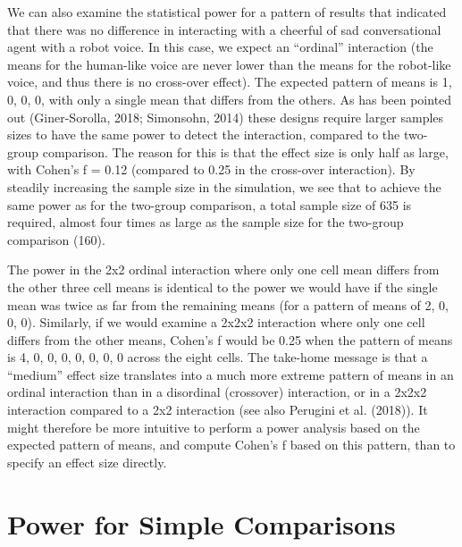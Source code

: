 \documentclass[,jou, draftfirst, a4paper,floatsintext]{apa6}
\begin{document}
We can also examine the statistical power for a pattern of results that indicated that there was no difference in interacting with a cheerful of sad conversational agent with a robot voice.
In this case, we expect an \enquote{ordinal} interaction (the means for the human-like voice are never lower than the means for the robot-like voice, and thus there is no cross-over effect).
The expected pattern of means is 1, 0, 0, 0, with only a single mean that differs from the others.
As has been pointed out (Giner-Sorolla, 2018; Simonsohn, 2014) these designs require larger samples sizes to have the same power to detect the interaction, compared to the two-group comparison.
The reason for this is that the effect size is only half as large, with Cohen's f = 0.12
(compared to 0.25 in the cross-over interaction).
By steadily increasing the sample size in the simulation, we see that to achieve the same power as for the two-group comparison, a total sample size of 635 is required, almost four times as large as the sample size for the two-group comparison (160).

The power in the 2x2 ordinal interaction where only one cell mean differs from the other three cell means is identical to the power we would have if the single mean was twice as far from the remaining means (for a pattern of means of 2, 0, 0, 0).
Similarly, if we would examine a 2x2x2 interaction where only one cell differs from the other means, Cohen's f would be 0.25 when the pattern of means is 4, 0, 0, 0, 0, 0, 0, 0 across the eight cells.
The take-home message is that a \enquote{medium} effect size translates into a much more extreme pattern of means in an ordinal interaction than in a disordinal (crossover) interaction, or in a 2x2x2 interaction compared to a 2x2 interaction (see also Perugini et al. (2018)).
It might therefore be more intuitive to perform a power analysis based on the expected pattern of means, and compute Cohen's f based on this pattern, than to specify an effect size directly.

\hypertarget{power-for-simple-comparisons}{%
\section{Power for Simple Comparisons}\label{power-for-simple-comparisons}}
\end{document}

